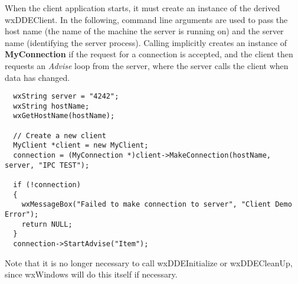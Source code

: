 When the client application starts, it must create an instance of the derived wxDDEClient. In the following, command line
arguments are used to pass the host name (the name of the machine the server is running
on) and the server name (identifying the server process). Calling \rtfsp
implicitly creates an instance of {\bf MyConnection} if the request for a
connection is accepted, and the client then requests an {\it Advise} loop
from the server, where the server calls the client when data has changed.

\begin{verbatim}
  wxString server = "4242";
  wxString hostName;
  wxGetHostName(hostName);

  // Create a new client
  MyClient *client = new MyClient;
  connection = (MyConnection *)client->MakeConnection(hostName, server, "IPC TEST");

  if (!connection)
  {
    wxMessageBox("Failed to make connection to server", "Client Demo Error");
    return NULL;
  }
  connection->StartAdvise("Item");
\end{verbatim}

Note that it is no longer necessary to call wxDDEInitialize or wxDDECleanUp, since
wxWindows will do this itself if necessary.

